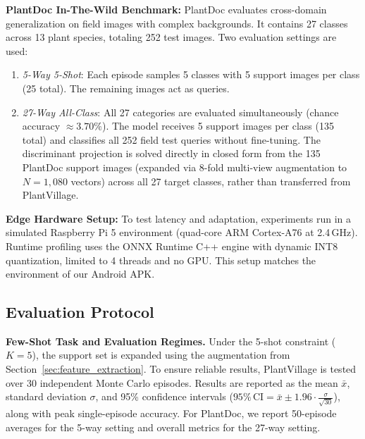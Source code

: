 \documentclass[conference]{IEEEtran}
\begin{document}
\textbf{PlantDoc In-The-Wild Benchmark:} PlantDoc evaluates cross-domain generalization on field images with complex backgrounds. It contains 27 classes across 13 plant species, totaling 252 test images. Two evaluation settings are used:
\begin{enumerate}\setlength{\itemsep}{1pt plus 0.5pt}\setlength{\parsep}{0pt}
    \item \textit{5-Way 5-Shot}: Each episode samples 5 classes with 5 support images per class (25 total). The remaining images act as queries.
    \item \textit{27-Way All-Class}: All 27 categories are evaluated simultaneously (chance accuracy $\approx 3.70\%$). The model receives 5 support images per class (135 total) and classifies all 252 field test queries without fine-tuning. The discriminant projection is solved directly in closed form from the 135 PlantDoc support images (expanded via 8-fold multi-view augmentation to $N = 1{,}080$ vectors) across all 27 target classes, rather than transferred from PlantVillage.
\end{enumerate}

\textbf{Edge Hardware Setup:} To test latency and adaptation, experiments run in a simulated Raspberry Pi 5 environment (quad-core ARM Cortex-A76 at 2.4\,GHz). Runtime profiling uses the ONNX Runtime C++ engine with dynamic INT8 quantization, limited to 4 threads and no GPU. This setup matches the environment of our Android APK.

\subsection{Evaluation Protocol}
\label{sec:eval_protocol}
\textbf{Few-Shot Task and Evaluation Regimes.} Under the 5-shot constraint ($K=5$), the support set is expanded using the augmentation from Section~\ref{sec:feature_extraction}. To ensure reliable results, PlantVillage is tested over 30 independent Monte Carlo episodes. Results are reported as the mean $\bar{x}$, standard deviation $\sigma$, and 95\% confidence intervals ($95\%\,\text{CI} = \bar{x} \pm 1.96 \cdot \frac{\sigma}{\sqrt{30}}$), along with peak single-episode accuracy. For PlantDoc, we report 50-episode averages for the 5-way setting and overall metrics for the 27-way setting.
\end{document}
